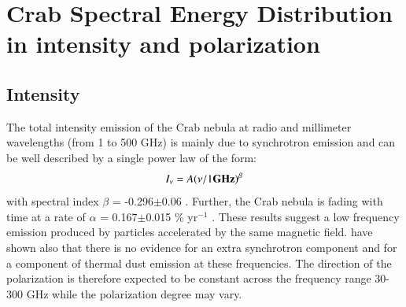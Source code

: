 \documentclass[twocolumn,traditabstract]{aa}
\def\NIKA{\textit{NIKA}}
\def\Planck{\textit{Planck}}
\def\WMAP{\textit{WMAP}}
\begin{document}


\section{Crab Spectral Energy Distribution in intensity and polarization}\label{sec:Polarization intensity Spectral Energy Density (SED)}
\subsection{Intensity}
The total intensity emission of the Crab nebula at radio and millimeter
wavelengths (from 1 to 500 GHz) is mainly due to synchrotron emission and can be
well described by a single power law of the form:
\begin{equation}
I_{\nu} = A(\nu / 1 {\bf GHz})^{\beta}
\end{equation}\label{eq:sync}
with spectral index $\beta$ = -0.296$\pm$0.06 \citep{baars1977absolute,macias2010}. Further, the Crab nebula is fading with time at a rate of $\alpha$ = 0.167$\pm$0.015 \% yr$^{-1}$ \citep{aller1985decrease}. 
These results suggest a low frequency emission produced by particles accelerated by the same magnetic field. \cite{macias2010} have shown also that there is no evidence for an extra synchrotron component and for a component of thermal dust emission at these frequencies. The direction of the polarization is therefore expected to be constant across the frequency range 30-300 GHz while the polarization degree may vary.
\end{document}
